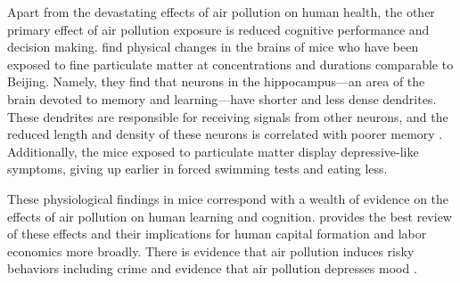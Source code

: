 Apart from the devastating effects of air pollution on human health, the other primary effect of air pollution exposure is reduced cognitive performance and decision making. \cite{fonken2011air} find physical changes in the brains of mice who have been exposed to fine particulate matter at concentrations and durations comparable to Beijing. Namely, they find that neurons in the hippocampus---an area of the brain devoted to memory and learning---have shorter and less dense dendrites. These dendrites are responsible for receiving signals from other neurons, and the reduced length and density of these neurons is correlated with poorer memory \citep{weir2012smog}. Additionally, the mice exposed to particulate matter display depressive-like symptoms, giving up earlier in forced swimming tests and eating less. 

These physiological findings in mice correspond with a wealth of evidence on the effects of air pollution on human learning and cognition. \cite{aguilar2022air} provides the best review of these effects and their implications for human capital formation and labor economics more broadly. There is evidence that air pollution induces risky behaviors including crime \citep{burkhardt2019effect, bondy2020crime} and evidence that air pollution depresses mood \citep{zheng2019air}.





